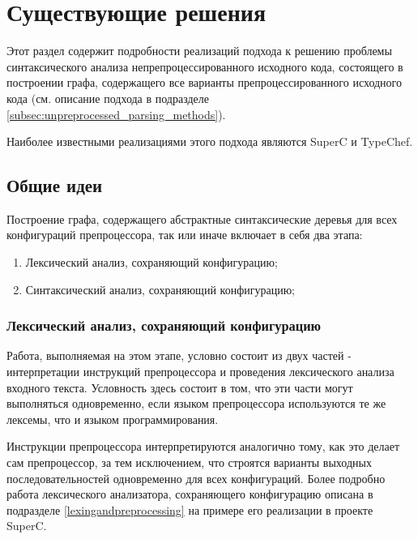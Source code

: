 \clearpage

\section{Существующие решения}

Этот раздел содержит подробности реализаций подхода к решению проблемы синтаксического анализа непрепроцессированного исходного кода, состоящего в построении графа, содержащего все варианты препроцессированного исходного кода (см. описание подхода в подразделе \ref{subsec:unpreprocessed_parsing_methods}).

Наиболее известными реализациями этого подхода являются SuperC\cite{superc} и TypeChef\cite{typechef}.

\subsection{Общие идеи}
\label{subsec:commonideas}

Построение графа, содержащего абстрактные синтаксические деревья для всех конфигураций препроцессора, так или иначе включает в себя два этапа:

\begin{enumerate}

\item Лексический анализ, сохраняющий конфигурацию;
\item Синтаксический анализ, сохраняющий конфигурацию;

\end{enumerate} 

\subsubsection{Лексический анализ, сохраняющий конфигурацию}
\label{subsubsec:configurationpreservinglexing}

Работа, выполняемая на этом этапе, условно состоит из двух частей - интерпретации инструкций препроцессора и проведения лексического анализа входного текста. Условность здесь состоит в том, что эти части могут выполняться одновременно, если языком препроцессора используются те же лексемы, что и языком программирования.

Инструкции препроцессора интерпретируются аналогично тому, как это делает сам препроцессор, за тем исключением, что строятся варианты выходных последовательностей одновременно для всех конфигураций. Более подробно работа лексического анализатора, сохраняющего конфигурацию описана в подразделе \ref{lexingandpreprocessing} на примере его реализации в проекте SuperC.

